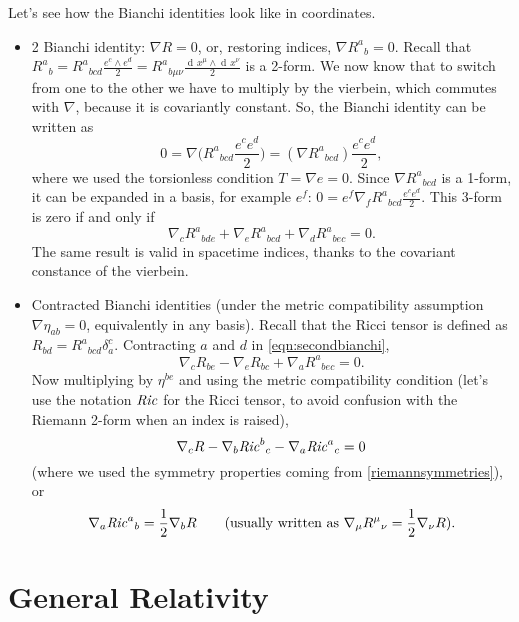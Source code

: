 \documentclass[a4paper,12pt]{book}
\newcommand{\ap}[1]{\textormath{\textsuperscript{#1}}{^{\mathrm{#1}}}}
\newcommand{\dd}{\mathop{\mathrm{d}\!}{}}
\theoremstyle{definition}
\theoremstyle{remark}
\begin{document}
Let's see how the Bianchi identities look like in coordinates.
\begin{itemize}
\item 2\ap{nd} Bianchi identity: $\nabla R=0$, or, restoring indices, $\nabla R^a{}_b=0$. Recall that $R^a{}_b=R^a{}_{bcd}\frac{e^c\wedge e^d}{2}=R^a{}_{b\mu\nu}\frac{\dd x^\mu\wedge\dd x^\nu}{2}$ is a 2-form. We now know that to switch from one to the other we have to multiply by the vierbein, which commutes with $\nabla$, because it is covariantly constant. So, the Bianchi identity can be written as
\[0=\nabla\biggl(R^a{}_{bcd}\frac{e^ce^d}{2}\biggr)=(\nabla R^a{}_{bcd})\frac{e^ce^d}{2},\]
where we used the torsionless condition $T=\nabla e=0$. Since $\nabla R^a{}_{bcd}$ is a 1-form, it can be expanded in a basis, for example $e^f$: $0=e^f\nabla_fR^a{}_{bcd}\frac{e^ce^d}{2}$. This 3-form is zero if and only if
\begin{equation}
\nabla_c R^a{}_{bde}+\nabla_eR^a{}_{bcd}+\nabla_dR^a{}_{bec}=0.
\label{eqn:secondbianchi}
\end{equation}
The same result is valid in spacetime indices, thanks to the covariant constance of the vierbein.
\item Contracted Bianchi identities (under the metric compatibility assumption $\nabla\eta_{ab}=0$, equivalently in any basis). Recall that the Ricci tensor is defined as $R_{bd}=R^a{}_{bcd}\delta^c_a$. Contracting $a$ and $d$ in \cref{eqn:secondbianchi},
\[\nabla_cR_{be}-\nabla_eR_{bc}+\nabla_aR^a{}_{bec}=0.\]
Now multiplying by $\eta^{be}$ and using the metric compatibility condition (let's use the notation $\text{\emph{Ric}}$ for the Ricci tensor, to avoid confusion with the Riemann 2-form when an index is raised),
\[\nabla_cR-\nabla_b\text{\emph{Ric}}^b{}_c-\nabla_a\text{\emph{Ric}}^a{}_c=0\]
(where we used the symmetry properties coming from \cref{riemannsymmetries}), or
\[\nabla_a\text{\emph{Ric}}^a{}_b=\frac{1}{2}\nabla_bR\qquad(\text{usually written as } \nabla_\mu R^\mu{}_\nu=\frac{1}{2}\nabla_\nu R).\]
\end{itemize}



\chapter{General Relativity}
\end{document}
